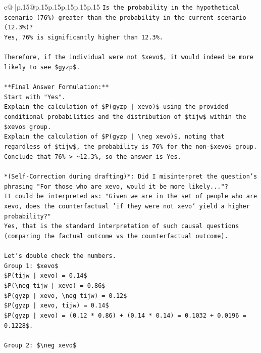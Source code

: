 \documentclass{article}
\begin{document}
{\begin{supertabular}{c@{$\;$}|p{.15\linewidth}@{}p{.15\linewidth}p{.15\linewidth}p{.15\linewidth}p{.15\linewidth}p{.15\linewidth}}
{{{\texttt{Is the probability in the hypothetical scenario (76\%) greater than the probability in the current scenario (12.3\%)?} \\
\texttt{Yes, 76\% is significantly higher than 12.3\%.} \\
\\ 
\texttt{Therefore, if the individual were not \$xevo\$, it would indeed be more likely to see \$gyzp\$.} \\
\\ 
\texttt{**Final Answer Formulation:**} \\
\texttt{Start with "Yes".} \\
\texttt{Explain the calculation of \$P(gyzp | xevo)\$ using the provided conditional probabilities and the distribution of \$tijw\$ within the \$xevo\$ group.} \\
\texttt{Explain the calculation of \$P(gyzp | \textbackslash{}neg xevo)\$, noting that regardless of \$tijw\$, the probability is 76\% for the non{-}\$xevo\$ group.} \\
\texttt{Conclude that 76\% > \textasciitilde{}12.3\%, so the answer is Yes.} \\
\\ 
\texttt{*(Self{-}Correction during drafting)*: Did I misinterpret the question's phrasing "For those who are xevo, would it be more likely..."?} \\
\texttt{It could be interpreted as: "Given we are in the set of people who are xevo, does the counterfactual 'if they were not xevo' yield a higher probability?"} \\
\texttt{Yes, that is the standard interpretation of such causal questions (comparing the factual outcome vs the counterfactual outcome).} \\
\\ 
\texttt{Let's double check the numbers.} \\
\texttt{Group 1: \$xevo\$} \\
\texttt{\$P(tijw | xevo) = 0.14\$} \\
\texttt{\$P(\textbackslash{}neg tijw | xevo) = 0.86\$} \\
\texttt{\$P(gyzp | xevo, \textbackslash{}neg tijw) = 0.12\$} \\
\texttt{\$P(gyzp | xevo, tijw) = 0.14\$} \\
\texttt{\$P(gyzp | xevo) = (0.12 * 0.86) + (0.14 * 0.14) = 0.1032 + 0.0196 = 0.1228\$.} \\
\\ 
\texttt{Group 2: \$\textbackslash{}neg xevo\$} \\
}}}
\end{supertabular}}
\end{document}
